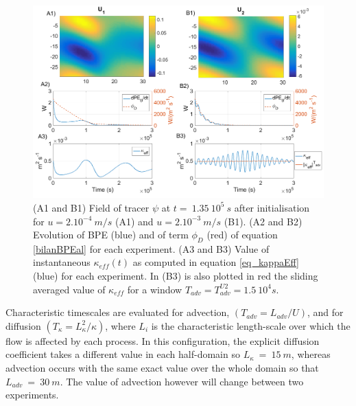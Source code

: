 \begin{figure}[h!]
\centering
\includegraphics[width=1\textwidth]{./CHAP_BPE/Fig_numlab_advdiff3.png}
\caption[Tracer field and evaluation of $\kappa_{eff}$ for configuration $BPE_{ts}$]{(A1 and B1) Field of tracer $\psi$ at $t= \ 1.35\ 10^5\ s$ after initialisation for $u=2.10^{-4} \ m/s$ (A1) and $u=2.10^{-3} \ m/s$ (B1). (A2 and B2) Evolution of BPE (blue) and of term $\phi_D$ (red) of equation \ref{bilanBPEal} for each experiment. (A3 and B3) Value of instantaneous $\kappa_{eff} (t)$ as computed in equation \ref{eq_kappaEff} (blue) for each experiment. In (B3) is also plotted in red the sliding averaged value of $\kappa_{eff}$ for a window $T_{adv}=T_{adv}^{U2}=1.5\ 10^4 s$.}
\label{fig4numlab}
\end{figure}
Characteristic timescales are evaluated for advection, $(T_{adv}=L_{adv}/U)$, and for diffusion $(T_{\kappa}=L_{\kappa}^2/{\kappa})$, where $L_i$ is the characteristic length-scale over which the flow is affected by each process. In this configuration, the explicit diffusion coefficient takes a different value in each half-domain so $L_{\kappa}\ =\ 15\ m$, whereas advection occurs with the same exact value over the whole domain so that $L_{adv}\ =\ 30\ m$. The value of advection however will change between two experiments.

